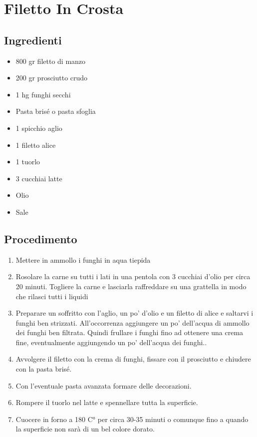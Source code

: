 \section{Filetto In Crosta}
\subsection{Ingredienti}
\begin{itemize}
\item 800 gr filetto di manzo  
\item 200 gr prosciutto crudo  
\item 1 hg funghi secchi  
\item Pasta brisé o pasta sfoglia   
\item 1 spicchio aglio  
\item 1 filetto alice  
\item 1 tuorlo  
\item 3 cucchiai latte  
\item Olio  
\item Sale
\end{itemize}
\subsection{Procedimento}
\begin{enumerate}
\item  Mettere in ammollo i funghi in aqua tiepida
\item  Rosolare la carne su tutti i lati in una pentola con 3 cucchiai d'olio per circa 20 minuti. Togliere la carne e lasciarla raffreddare su una grattella in modo che rilasci tutti i liquidi
\item  Preparare un soffritto con l'aglio, un po' d'olio e un filetto di alice e saltarvi i funghi ben strizzati. All'occorrenza aggiungere un po' dell'acqua di ammollo dei funghi ben filtrata. Quindi frullare i funghi fino ad ottenere una crema fine, eventualmente aggiungendo un po' dell'acqua dei funghi..  
\item  Avvolgere il filetto con la crema di funghi, fissare con il prosciutto e chiudere con la pasta brisé.  
\item  Con l'eventuale pasta avanzata formare delle decorazioni.  
\item  Rompere il tuorlo nel latte e spennellare tutta la superficie.  
\item  Cuocere in forno a 180 C° per circa 30-35 minuti o comunque fino a quando la superficie non sarà di un bel colore dorato.
\end{enumerate}
